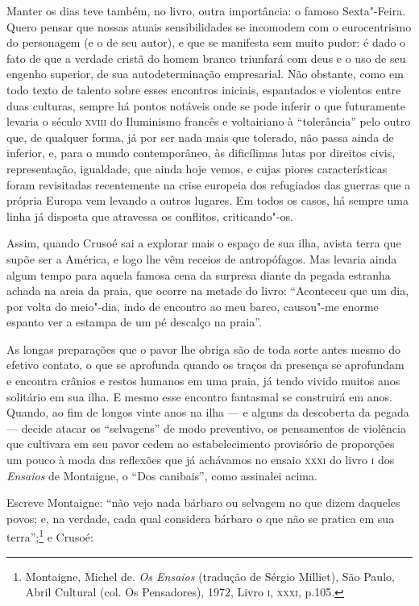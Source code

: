 Manter os dias teve também, no livro, outra importância: o famoso
Sexta"-Feira. Quero pensar que nossas atuais sensibilidades se incomodem
com o eurocentrismo do personagem (e o de seu autor), e que se manifesta
sem muito pudor: é dado o fato de que a verdade cristã do homem branco
triunfará com deus e o uso de seu engenho superior, de sua
autodeterminação empresarial. Não obstante, como em todo texto de
talento sobre esses encontros iniciais, espantados e violentos entre
duas culturas, sempre há pontos notáveis onde se pode inferir o que
futuramente levaria o século \textsc{xviii} do Iluminismo francês e voltairiano à
``tolerância'' pelo outro que, de qualquer forma, já por ser nada mais
que tolerado, não passa ainda de inferior, e, para o mundo
contemporâneo, às dificílimas lutas por direitos civis, representação,
igualdade, que ainda hoje vemos, e cujas piores características foram
revisitadas recentemente na crise europeia dos refugiados das guerras
que a própria Europa vem levando a outros lugares. Em todos os casos, há
sempre uma linha já disposta que atravessa os conflitos, criticando"-os.

Assim, quando Crusoé sai a explorar mais o espaço de sua ilha, avista
terra que supõe ser a América, e logo lhe vêm receios de antropófagos.
Mas levaria ainda algum tempo para aquela famosa cena da surpresa diante
da pegada estranha achada na areia da praia, que ocorre na metade do
livro: ``Aconteceu que um dia, por volta do meio"-dia, indo de encontro
ao meu barco, causou"-me enorme espanto ver a estampa de um pé descalço
na praia''.

As longas preparações que o pavor lhe obriga são de toda sorte antes
mesmo do efetivo contato, o que se aprofunda quando os traços da
presença se aprofundam e encontra crânios e restos humanos em uma praia,
já tendo vivido muitos anos solitário em sua ilha. E mesmo esse encontro
fantasmal se construirá em anos. Quando, ao fim de longos vinte anos na
ilha --- e alguns da descoberta da pegada --- decide atacar os
``selvagens'' de modo preventivo, os pensamentos de violência que
cultivara em seu pavor cedem ao estabelecimento provisório de proporções
um pouco à moda das reflexões que já achávamos no ensaio \textsc{xxxi} do livro \textsc{i}
dos \emph{Ensaios} de Montaigne, o ``Dos canibais'', como assinalei
acima.

Escreve Montaigne: ``não vejo nada bárbaro ou selvagem no que dizem
daqueles povos; e, na verdade, cada qual considera bárbaro o que não se
pratica em sua terra'';\footnote{Montaigne, Michel de. \emph{Os Ensaios}
  (tradução de Sérgio Milliet), São Paulo, Abril Cultural (col. Os
  Pensadores), 1972, Livro \textsc{i}, \textsc{xxxi}, p.105.} e Crusoé:

